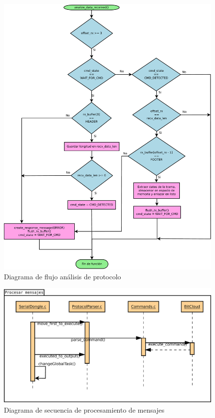 \begin{figure}
	\centering
	\includegraphics[scale=0.25]{capitulo_3_imgs/analisis_mensaje_flujo_parser.pdf}
	\caption{Diagrama de flujo análisis de protocolo}
	\label{fig:diagrama_flujo_parser}
\end{figure}

\begin{figure}
	\centering
	\includegraphics[scale=0.35]{capitulo_3_imgs/procesar_mensajes_secuencia.pdf}
	\caption{Diagrama de secuencia de procesamiento de mensajes}
	\label{fig:diagrama_secuencia_procesamiento}
\end{figure}

